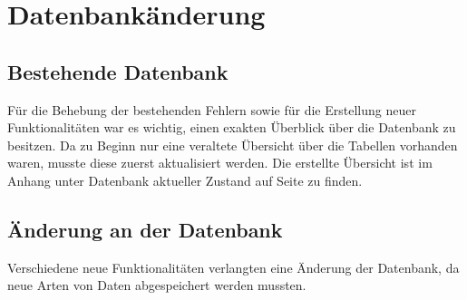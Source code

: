 

\section{Datenbankänderung}

\subsection{Bestehende Datenbank}

Für die Behebung der bestehenden Fehlern sowie für die Erstellung neuer Funktionalitäten war es wichtig, einen exakten Überblick über die Datenbank zu besitzen. Da zu Beginn nur eine veraltete Übersicht über die Tabellen vorhanden waren, musste diese zuerst aktualisiert werden. Die erstellte Übersicht ist im Anhang unter \glqq Datenbank aktueller Zustand \grqq auf Seite \hyperlink{page.\getpagerefnumber{pdf:dbVorVeraenderung}}{} zu finden.



\subsection{Änderung an der Datenbank}
\label{subsec:DBAenderungen}
Verschiedene neue Funktionalitäten verlangten eine Änderung der Datenbank, da neue Arten von Daten abgespeichert werden mussten.


